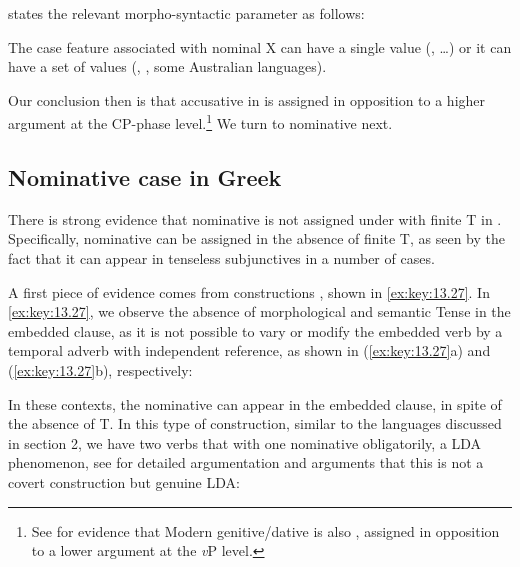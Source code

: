 \documentclass[output=paper]{langsci/langscibook}
\begin{document}
\citet{Baker2015} states the relevant morpho-syntactic parameter as follows:

\ea%
    \label{ex:key:13.26}
    The case feature associated with nominal X can have a single value
    (, \emph{} \dots) or it can have a set of values
    (, , some Australian languages).
\z

Our conclusion then is that accusative in  is  assigned in
opposition to a higher argument at the CP-phase level.\footnote{See
    \citet{AnaSev2016} for evidence that Modern  genitive/dative is also
    , assigned in opposition to a lower argument at the \emph{v}P
level.} We turn to nominative next.

\subsection{Nominative case in Greek}\label{sec:key:13.3.2}

There is strong evidence that nominative is not assigned under  with
finite T in . Specifically, nominative can be assigned in the absence of
finite T, as seen by the fact that it can appear in tenseless subjunctives in a
number of cases.

A first piece of evidence comes from   constructions
\parencite{AleAna1999}, shown in \eqref{ex:key:13.27}. In \eqref{ex:key:13.27},
we observe the absence of morphological and semantic Tense in the embedded
clause, as it is not possible to vary or modify the embedded verb by a temporal
adverb with independent reference, as shown in (\ref{ex:key:13.27}a) and
(\ref{ex:key:13.27}b), respectively:

\ea\label{ex:key:13.27}
    \z
\z

In these contexts, the nominative can appear in the embedded clause, in spite
of the absence of T. In this type of construction, similar to the languages
discussed in section 2, we have two verbs that  with one nominative
obligatorily, a \gls{LDA} phenomenon, see \textcite{AleAnaIorMar2012} for
detailed argumentation and arguments that this is not a covert 
construction but genuine \gls{LDA}:\newpage
\end{document}
